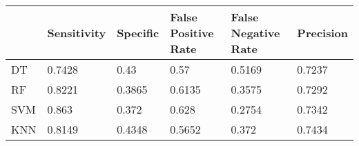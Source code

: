\begin{table}[!h]
\begin{tabular}{l | l | l| l| l | l}
 & Sensitivity & Specific & False Positive Rate & False Negative Rate & Precision \\\hline
DT & 0.7428 & 0.43 & 0.57 & 0.5169 & 0.7237\\
RF & 0.8221 & 0.3865 & 0.6135 & 0.3575 & 0.7292\\
SVM & 0.863 & 0.372 & 0.628 & 0.2754 & 0.7342\\
KNN & 0.8149 & 0.4348 & 0.5652 & 0.372 & 0.7434\\
\end{tabular}
\caption{}
\end{table}
